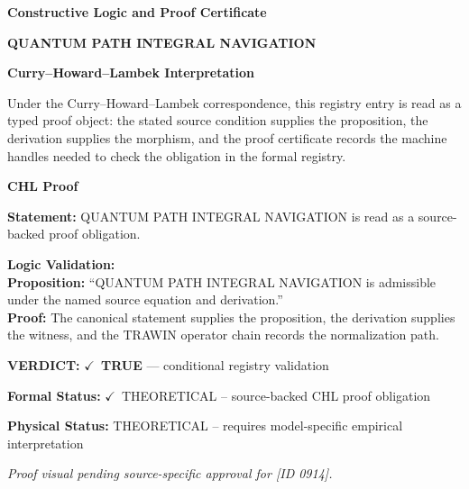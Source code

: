 \clearpage
\begingroup\tzpsupportsetup
\noindent\textbf{\fontsize{10.8pt}{12.8pt}\selectfont [ID 0914] Constructive Logic and Proof Certificate}\par
\noindent\textbf{\fontsize{10pt}{12pt}\selectfont QUANTUM PATH INTEGRAL NAVIGATION}\par
\vspace{0.45em}
\begingroup
\footnotesize
\setlength{\parskip}{0.22em}
\setlength{\parindent}{0pt}
\noindent\textbf{Curry--Howard--Lambek Interpretation}\par
Under the Curry--Howard--Lambek correspondence, this registry entry is read as a typed proof
object: the stated source condition supplies the proposition, the derivation supplies the
morphism, and the proof certificate records the machine handles needed to check the obligation
in the formal registry.

\vspace{0.45em}
\noindent\textbf{CHL Proof}\par
\textbf{Statement:} QUANTUM PATH INTEGRAL NAVIGATION is read as a source-backed proof obligation.

\textbf{Logic Validation:}\\
\textbf{Proposition:} ``QUANTUM PATH INTEGRAL NAVIGATION is admissible under the named source equation and derivation.''\\
\textbf{Proof:} The canonical statement supplies the proposition, the derivation supplies the witness, and the TRAWIN operator chain records the normalization path.

\textbf{VERDICT:} \ensuremath{\checkmark}\ \textbf{TRUE} --- conditional registry validation

\textbf{Formal Status:} \ensuremath{\checkmark}\ THEORETICAL -- source-backed CHL proof obligation

\textbf{Physical Status:} THEORETICAL -- requires model-specific empirical interpretation
\par\vspace{0.45em}
\par
\vfill
\begingroup\footnotesize\itshape
Proof visual pending source-specific approval for [ID 0914].
\par\endgroup
\vfill
\endgroup
\endgroup
